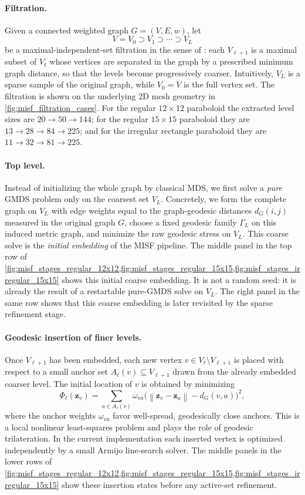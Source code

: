 \documentclass[twoside,11pt]{article}
\newcommand{\bz}{\mathbf{z}}
\newcommand{\norm}[1]{\left\|#1\right\|}
\begin{document}
\paragraph{Filtration.}
Given a connected weighted graph $G=(V,E,w)$, let
\[
  V = V_0 \supset V_1 \supset \cdots \supset V_L
\]
be a maximal-independent-set filtration in the sense of
\citet{gajer2004multidimensional,gajer2002grip}: each $V_{\ell+1}$ is a maximal
subset of $V_\ell$ whose vertices are separated in the graph by a prescribed
minimum graph distance, so that the levels become progressively coarser.
Intuitively, $V_L$ is a sparse sample of the original graph, while $V_0=V$ is
the full vertex set.  The filtration is shown on the underlying $2$D mesh
geometry in \cref{fig:misf_filtration_cases}.  For the regular $12\times 12$
paraboloid the extracted level sizes are $20 \rightarrow 50 \rightarrow 144$;
for the regular $15\times 15$ paraboloid they are
$13 \rightarrow 28 \rightarrow 84 \rightarrow 225$; and for the irregular
rectangle paraboloid they are $11 \rightarrow 32 \rightarrow 81 \rightarrow
225$.

\paragraph{Top level.}
Instead of initializing the whole graph by classical MDS, we first solve a
\emph{pure} GMDS problem only on the coarsest set $V_L$.  Concretely, we form
the complete graph on $V_L$ with edge weights equal to the graph-geodesic
distances $d_G(i,j)$ measured in the original graph $G$, choose a fixed
geodesic family $\Gamma_L$ on this induced metric graph, and minimize the raw
geodesic stress on $V_L$.  This coarse solve is the \emph{initial embedding} of
the MISF pipeline.  The middle panel in the top row of
\cref{fig:misf_stages_regular_12x12,fig:misf_stages_regular_15x15,fig:misf_stages_irregular_15x15}
shows this initial coarse embedding.  It is not a random seed: it is already
the result of a restartable pure-GMDS solve on $V_L$.  The right panel in the
same row shows that this coarse embedding is later revisited by the sparse
refinement stage.

\paragraph{Geodesic insertion of finer levels.}
Once $V_{\ell+1}$ has been embedded, each new vertex $v \in V_\ell \setminus
V_{\ell+1}$ is placed with respect to a small anchor set
$A_\ell(v) \subseteq V_{\ell+1}$ drawn from the already embedded coarser level.
The initial location of $v$ is obtained by minimizing
\[
  \Phi_\ell(\bz_v)
  =
  \sum_{a \in A_\ell(v)}
  \omega_{va}
  \bigl( \norm{\bz_v - \bz_a} - d_G(v,a) \bigr)^2,
\]
where the anchor weights $\omega_{va}$ favor well-spread, geodesically close
anchors.  This is a local nonlinear least-squares problem and plays the role of
geodesic trilateration.  In the current implementation each inserted vertex is
optimized independently by a small Armijo line-search solver.  The middle
panels in the lower rows of
\cref{fig:misf_stages_regular_12x12,fig:misf_stages_regular_15x15,fig:misf_stages_irregular_15x15}
show these insertion states before any active-set refinement.
\end{document}
